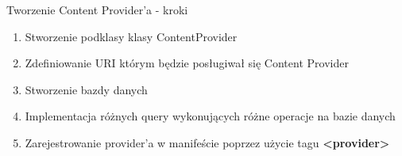 \documentclass{beamer}
\begin{document}
\begin{frame}{Tworzenie Content Provider'a - kroki}
	\begin{enumerate}
		\item Stworzenie podklasy klasy ContentProvider
		\item Zdefiniowanie URI którym będzie posługiwał się Content Provider
		\item Stworzenie bazdy danych
		\item Implementacja różnych query wykonujących różne operacje na bazie danych
		\item Zarejestrowanie provider'a w manifeście poprzez użycie tagu \textbf{<provider>}
	\end{enumerate}
\end{frame}
\end{document}
